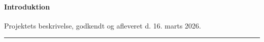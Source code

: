 \paragraph{Introduktion} Projektets beskrivelse, godkendt og afleveret d. 16. marts 2026.\\
\hrule

